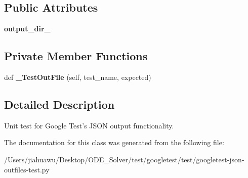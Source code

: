 \subsection*{Public Attributes}
\begin{DoxyCompactItemize}
\item 
\mbox{\label{classgoogletest-json-outfiles-test_1_1_g_test_json_out_files_test_a18e262639002fb485155961593efad20}} 
{\bfseries output\+\_\+dir\+\_\+}
\end{DoxyCompactItemize}
\subsection*{Private Member Functions}
\begin{DoxyCompactItemize}
\item 
\mbox{\label{classgoogletest-json-outfiles-test_1_1_g_test_json_out_files_test_ac8c86b641d2450e0ad17f1154692e7f8}} 
def {\bfseries \+\_\+\+Test\+Out\+File} (self, test\+\_\+name, expected)
\end{DoxyCompactItemize}


\subsection{Detailed Description}
\begin{DoxyVerb}Unit test for Google Test's JSON output functionality.\end{DoxyVerb}
 

The documentation for this class was generated from the following file\+:\begin{DoxyCompactItemize}
\item 
/\+Users/jiahuawu/\+Desktop/\+O\+D\+E\+\_\+\+Solver/test/googletest/test/googletest-\/json-\/outfiles-\/test.\+py\end{DoxyCompactItemize}
